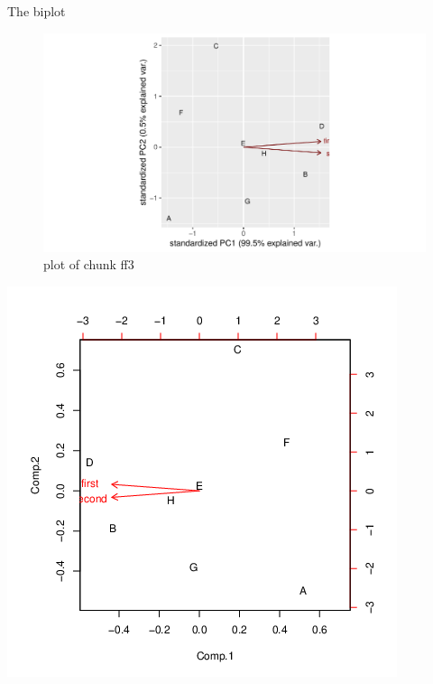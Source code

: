 \documentclass[ignorenonframetext,]{beamer}
\begin{document}
\begin{frame}{The biplot}
\protect\hypertarget{the-biplot-1}{}

\begin{figure}
\centering
\includegraphics{figure/ff3-1.pdf}
\caption{plot of chunk ff3}
\end{figure}

\includegraphics{bPrincomp-test-biplot.png}

\end{frame}
\end{document}
